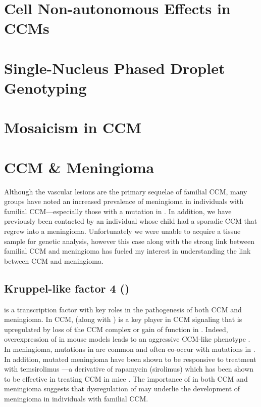 \section{Cell Non-autonomous Effects in CCMs}



\section{Single-Nucleus Phased Droplet Genotyping}


\section{Mosaicism in CCM}





\section{CCM \& Meningioma}
Although the vascular lesions are the primary sequelae of familial CCM, many groups have noted an increased prevalence of meningioma in individuals with familial CCM---especially those with a mutation in  \citep{labauge2009, riant2013, garaci2015}. In addition, we have previously been contacted by an individual whose child had a sporadic CCM that regrew into a meningioma. Unfortunately we were unable to acquire a tissue sample for genetic analysis, however this case along with the strong link between familial CCM and meningioma has fueled my interest in understanding the link between CCM and meningioma. 

\subsection{Kruppel-like factor 4 ()}
 is a transcription factor with key roles in the pathogenesis of both CCM and meningioma. In CCM,  (along with ) is a key player in CCM signaling that is upregulated by loss of the CCM complex or gain of function in  \citep{cuttano2016, zhou2016}. Indeed, overexpression of  in mouse models leads to an aggressive CCM-like phenotype \citep{ren2021}. In meningioma, mutations in  are common and often co-occur with mutations in  \citep{reuss2013}. In addition,  mutated meningioma have been shown to be responsive to treatment with temsirolimus \citep{vonSpreckelsen2020}—a derivative of rapamycin (sirolimus) which has been shown to be effective in treating CCM in mice \citep{ren2021}. The importance of  in both CCM and meningioma suggests that dysregulation of  may underlie the development of meningioma in individuals with familial CCM. 

